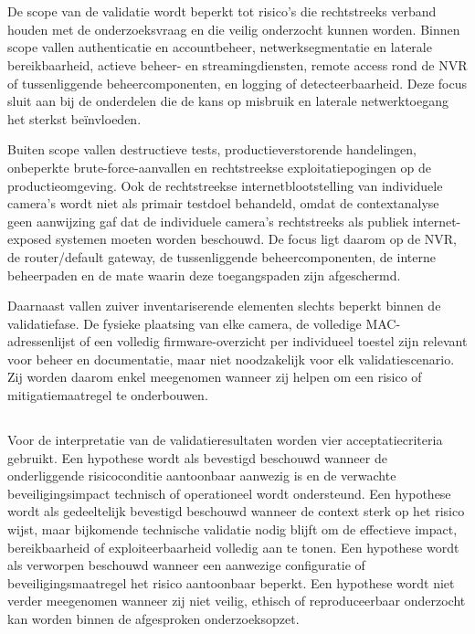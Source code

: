 \section{}%
\label{sec:scope-randvoorwaarden}

De scope van de validatie wordt beperkt tot risico's die rechtstreeks verband houden met de onderzoeksvraag en die veilig onderzocht kunnen worden. Binnen scope vallen authenticatie en accountbeheer, netwerksegmentatie en laterale bereikbaarheid, actieve beheer- en streamingdiensten, remote access rond de NVR of tussenliggende beheercomponenten, en logging of detecteerbaarheid. Deze focus sluit aan bij de onderdelen die de kans op misbruik en laterale netwerktoegang het sterkst beïnvloeden.

Buiten scope vallen destructieve tests, productieverstorende handelingen, onbeperkte brute-force-aanvallen en rechtstreekse exploitatiepogingen op de productieomgeving. Ook de rechtstreekse internetblootstelling van individuele camera's wordt niet als primair testdoel behandeld, omdat de contextanalyse geen aanwijzing gaf dat de individuele camera's rechtstreeks als publiek internet-exposed systemen moeten worden beschouwd. De focus ligt daarom op de NVR, de router/default gateway, de tussenliggende beheercomponenten, de interne beheerpaden en de mate waarin deze toegangspaden zijn afgeschermd.

Daarnaast vallen zuiver inventariserende elementen slechts beperkt binnen de validatiefase. De fysieke plaatsing van elke camera, de volledige MAC-adressenlijst of een volledig firmware-overzicht per individueel toestel zijn relevant voor beheer en documentatie, maar niet noodzakelijk voor elk validatiescenario. Zij worden daarom enkel meegenomen wanneer zij helpen om een risico of mitigatiemaatregel te onderbouwen.

\subsection{}%
\label{subsec:acceptatiecriteria}

Voor de interpretatie van de validatieresultaten worden vier acceptatiecriteria gebruikt. Een hypothese wordt als bevestigd beschouwd wanneer de onderliggende risicoconditie aantoonbaar aanwezig is en de verwachte beveiligingsimpact technisch of operationeel wordt ondersteund. Een hypothese wordt als gedeeltelijk bevestigd beschouwd wanneer de context sterk op het risico wijst, maar bijkomende technische validatie nodig blijft om de effectieve impact, bereikbaarheid of exploiteerbaarheid volledig aan te tonen. Een hypothese wordt als verworpen beschouwd wanneer een aanwezige configuratie of beveiligingsmaatregel het risico aantoonbaar beperkt. Een hypothese wordt niet verder meegenomen wanneer zij niet veilig, ethisch of reproduceerbaar onderzocht kan worden binnen de afgesproken onderzoeksopzet.

